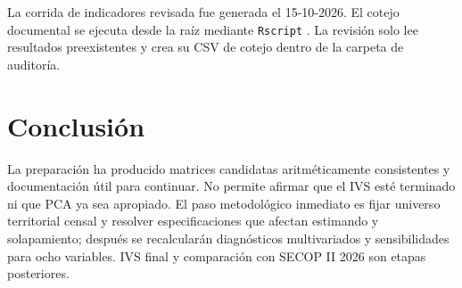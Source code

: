 \documentclass[11pt,a4paper]{article}
\begin{document}
La corrida de indicadores revisada fue generada el 15-10-2026. El cotejo documental se ejecuta desde la raíz mediante \texttt{Rscript} . La revisión solo lee resultados preexistentes y crea su CSV de cotejo dentro de la carpeta de auditoría.

\section{Conclusión}

La preparación ha producido matrices candidatas aritméticamente consistentes y documentación útil para continuar. No permite afirmar que el IVS esté terminado ni que PCA ya sea apropiado. El paso metodológico inmediato es fijar universo territorial censal y resolver especificaciones que afectan estimando y solapamiento; después se recalcularán diagnósticos multivariados y sensibilidades para ocho variables. IVS final y comparación con SECOP II 2026 son etapas posteriores.


\end{document}
